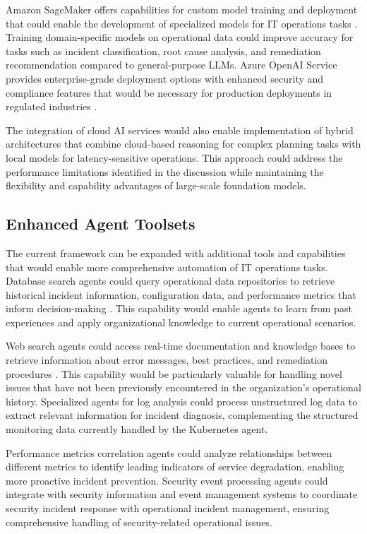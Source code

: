 \documentclass{article}
\begin{document}
Amazon SageMaker offers capabilities for custom model training and deployment that could enable the development of specialized models for IT operations tasks \cite{aws2024}. Training domain-specific models on operational data could improve accuracy for tasks such as incident classification, root cause analysis, and remediation recommendation compared to general-purpose LLMs. Azure OpenAI Service provides enterprise-grade deployment options with enhanced security and compliance features that would be necessary for production deployments in regulated industries \cite{microsoft2024}.

The integration of cloud AI services would also enable implementation of hybrid architectures that combine cloud-based reasoning for complex planning tasks with local models for latency-sensitive operations. This approach could address the performance limitations identified in the discussion while maintaining the flexibility and capability advantages of large-scale foundation models.

\subsection{Enhanced Agent Toolsets}

The current framework can be expanded with additional tools and capabilities that would enable more comprehensive automation of IT operations tasks. Database search agents could query operational data repositories to retrieve historical incident information, configuration data, and performance metrics that inform decision-making \cite{diaz2024}. This capability would enable agents to learn from past experiences and apply organizational knowledge to current operational scenarios.

Web search agents could access real-time documentation and knowledge bases to retrieve information about error messages, best practices, and remediation procedures \cite{zha2024}. This capability would be particularly valuable for handling novel issues that have not been previously encountered in the organization's operational history. Specialized agents for log analysis could process unstructured log data to extract relevant information for incident diagnosis, complementing the structured monitoring data currently handled by the Kubernetes agent.

Performance metrics correlation agents could analyze relationships between different metrics to identify leading indicators of service degradation, enabling more proactive incident prevention. Security event processing agents could integrate with security information and event management systems to coordinate security incident response with operational incident management, ensuring comprehensive handling of security-related operational issues.
\end{document}
